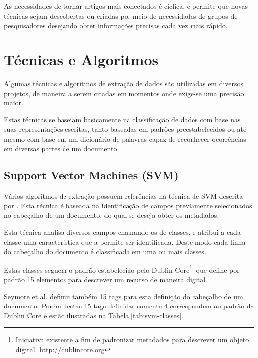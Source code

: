 \documentclass[
	12pt,               %
	openright,          %
	twoside,            %
	a4paper,            %
	english,            %
	brazil              %
	]{abntex2}
\begin{document}
As necessidades de tornar artigos mais conectados é cíclica, e permite que novas técnicas sejam descobertas ou criadas por meio de necessidades de grupos de pesquisadores desejando obter informações precisas cada vez mais rápido.

\section{Técnicas e Algoritmos}

Algumas técnicas e algoritmos de extração de dados são utilizadas em diversos projetos, de maneira a serem citadas em momentos onde exige-se uma precisão maior.

Estas técnicas se baseiam basicamente na classificação de dados com base nas suas representações escritas, tanto baseadas em padrões preestabelecidos ou até mesmo com base em um dicionário de palavras capaz de reconhecer ocorrências em diversas partes de um documento.

\subsection{Support Vector Machines (SVM)}

Vários algoritmos de extração possuem referências na técnica de SVM descrita por  \cite{svm}. Esta técnica é baseada na identificação de campos previamente selecionados no cabeçalho de um documento, do qual se deseja obter os metadados.

Esta técnica analisa diversos campos chamando-os de classes, e atribui a cada classe uma característica que a permite ser identificada. Deste modo cada linha do cabeçalho do documento é classificada em uma ou mais classes.

Estas classes seguem o padrão \cite{dublin-core} estabelecido pelo Dublin Core\footnote{Iniciativa existente a fim de padronizar metadados para descrever um objeto digital. \url{http://dublincore.org}}, que define por padrão 15 elementos para descrever um recurso de maneira digital.

Seymore et al. \cite{seymore} definiu também 15 tags para esta definição do cabeçalho de um documento. Porém destas 15 tags definidas somente 4 correspondem ao padrão da Dublin Core e estão ilustradas na Tabela \ref{tab:svm-classes}.
\end{document}
